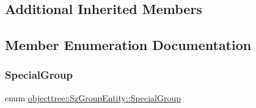 \subsection*{Additional Inherited Members}


\subsection{Member Enumeration Documentation}
\mbox{\label{classobjecttree_1_1_sz_group_entity_a90828031e49c36d5b4abded9a6dfb242}} 
\subsubsection{\texorpdfstring{SpecialGroup}{SpecialGroup}}
{\footnotesize\ttfamily enum \mbox{\hyperlink{classobjecttree_1_1_sz_group_entity_a90828031e49c36d5b4abded9a6dfb242}{objecttree\+::\+Sz\+Group\+Entity\+::\+Special\+Group}}}

